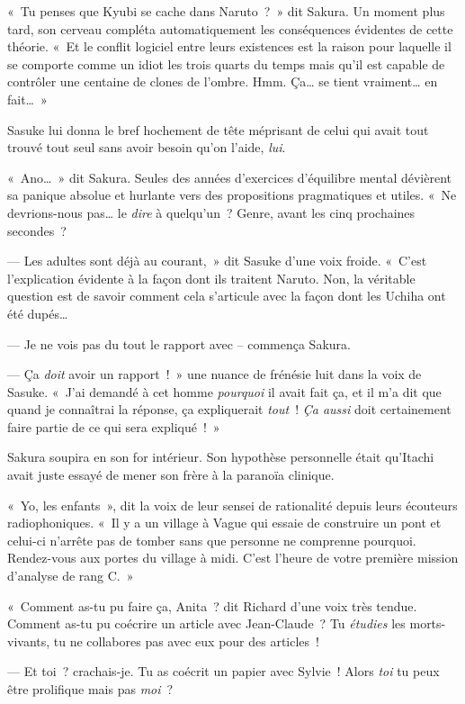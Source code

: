 «~Tu penses que Kyubi se cache dans Naruto~?~» dit Sakura. Un moment plus tard, son cerveau compléta automatiquement les conséquences évidentes de cette théorie. «~Et le conflit logiciel entre leurs existences est la raison pour laquelle il se comporte comme un idiot les trois quarts du temps mais qu'il est capable de contrôler une centaine de clones de l'ombre. Hmm. Ça… se tient vraiment… en fait…~»

Sasuke lui donna le bref hochement de tête méprisant de celui qui avait tout trouvé tout seul sans avoir besoin qu'on l'aide, \emph{lui}.

«~Ano…~» dit Sakura. Seules des années d'exercices d'équilibre mental dévièrent sa panique absolue et hurlante vers des propositions pragmatiques et utiles. «~Ne devrions-nous pas… le \emph{dire} à quelqu'un~? Genre, avant les cinq prochaines secondes~?

--- Les adultes sont déjà au courant,~» dit Sasuke d'une voix froide. «~C'est l'explication évidente à la façon dont ils traitent Naruto. Non, la véritable question est de savoir comment cela s'articule avec la façon dont les Uchiha ont été dupés…

--- Je ne vois pas du tout le rapport avec -- commença Sakura.

--- Ça \emph{doit} avoir un rapport~!~» une nuance de frénésie luit dans la voix de Sasuke. «~J'ai demandé à cet homme \emph{pourquoi} il avait fait ça, et il m'a dit que quand je connaîtrai la réponse, ça expliquerait \emph{tout}~! \emph{Ça aussi} doit certainement faire partie de ce qui sera expliqué~!~»

Sakura soupira en son for intérieur. Son hypothèse personnelle était qu'Itachi avait juste essayé de mener son frère à la paranoïa clinique.

«~Yo, les enfants~», dit la voix de leur sensei de rationalité depuis leurs écouteurs radiophoniques. «~Il y a un village à Vague qui essaie de construire un pont et celui-ci n'arrête pas de tomber sans que personne ne comprenne pourquoi. Rendez-vous aux portes du village à midi. C'est l'heure de votre première mission d'analyse de rang C.~»

\pagebreak[2]

«~Comment as-tu pu faire ça, Anita~? dit Richard d'une voix très tendue. Comment as-tu pu coécrire un article avec Jean-Claude~? Tu \emph{étudies} les morts-vivants, tu ne collabores pas avec eux pour des articles~!

--- Et toi~? crachais-je. Tu as coécrit un papier avec Sylvie~! Alors \emph{toi} tu peux être prolifique mais pas \emph{moi}~?

